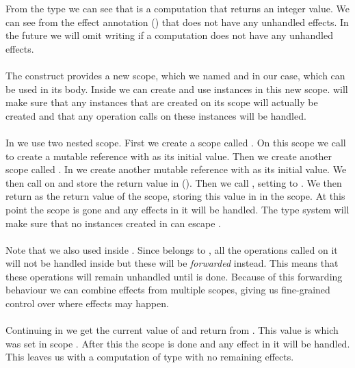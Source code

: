 From the type we can see that  is a computation that returns an integer value.
We can see from the effect annotation (\ident{!{}}) that  does not have any unhandled effects.
In the future we will omit writing \ident{!{}} if a computation does not have any unhandled effects.
\\\\
The  construct provides a new scope, which we named  and  in our case, which can be used in its body.
Inside  we can create and use instances in this new scope.
 will make sure that any instances that are created on its scope will actually be created and that any operation calls on these instances will be handled.
\\\\
In  we use two nested scope.
First we create a scope called .
On this scope we call  to create a mutable reference  with  as its initial value.
Then we create another scope called .
In  we create another mutable reference  with  as its initial value.
We then call  on  and store the return value in  ().
Then we call , setting  to .
We then return  as the return value of the  scope, storing this value in  in the  scope.
At this point the  scope is gone and any effects in it will be handled.
The type system will make sure that no instances created in  can escape .
\\\\
Note that we also used  inside .
Since  belongs to , all the operations called on it will not be handled inside  but these will be \emph{forwarded} instead.
This means that these operations will remain unhandled until  is done.
Because of this forwarding behaviour we can combine effects from multiple scopes, giving us fine-grained control over where effects may happen.
\\\\
Continuing in  we get the current value of  and return from .
This value is  which was set in scope .
After this the scope  is done and any effect in it will be handled.
This leaves us with a computation of type  with no remaining effects.

